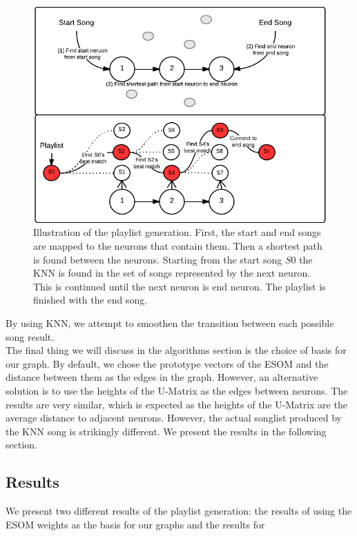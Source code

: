 \begin{figure}[htb!]
	\centering
	\includegraphics[width=\textwidth]{figures/playlist-generation}
	\caption{Illustration of the playlist generation. First, the start and end songs are mapped to the neurons that contain them. Then a shortest path is found between the neurons. Starting from the start song \(S0\) the KNN is found in the set of songs represented by the next neuron. This is continued until the next neuron is end neuron. The playlist is finished with the end song.}
\end{figure}

By using KNN, we attempt to smoothen the transition between each possible song result. \\
The final thing we will discuss in the algorithms section is the choice of basis for our graph. By default, we chose 
the prototype vectors of the ESOM and the distance between them as the edges in the graph. However, an alternative solution is to use the heights of the U-Matrix as the edges between neurons. The results are very similar, which is expected as the heights of the U-Matrix are the average distance to adjacent neurons. However, the actual songlist produced by the KNN song is strikingly different. We present the results in the following section.

\subsection{Results}

We present two different results of the playlist generation: the results of using the ESOM weights as the basis for our graphs and the results for 





